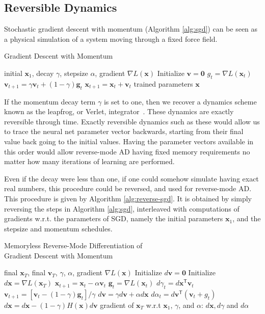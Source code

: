 \documentclass{article}
\newcommand{\vx}{\mathbf{x}}
\newcommand{\vv}{\mathbf{v}}
\newcommand{\vg}{\mathbf{g}}
\newcommand{\vzero}{\mathbf{0}}
\newcommand{\tra}{^{\mathsf{T}}}
\newcommand{\decay}{\gamma}
\newcommand{\stepsize}{\alpha}
\begin{document}
\subsection{Reversible Dynamics}

Stochastic gradient descent with momentum (Algorithm \ref{alg:sgd}) can be seen as a physical simulation of a system moving through a fixed force field.
%
\begin{algorithm}
   \caption{Gradient Descent with Momentum}
   \label{alg:sgd}
\begin{algorithmic}
    initial $\vx_1$, decay $\decay$, stepsize $\stepsize$, gradient $\nabla L(\vx)$
   \STATE Initialize $\vv = \vzero$
   \STATE $g_t = \nabla L(\vx_t)$
   \STATE $\vv_{t+1} = \decay \vv_t + (1 - \decay) \vg_t$ 
   \STATE $\vx_{t+1} = \vx_t + \vv_t$ 
   \ENDFOR
   \RETURN trained parameters $\vx$   
\end{algorithmic}
\end{algorithm}
%
If the momentum decay term $\gamma$ is set to one, then we recover a dynamics scheme known as the leapfrog, or Verlet, integrator~\citep{leapfrog1995}.
These dynamics are exactly reversible through time.
Exactly reversible dynamics such as these would allow us to trace the neural net parameter vector backwards, starting from their final value back going to the initial values.
Having the parameter vectors available in this order would allow reverse-mode AD having fixed memory requirements no matter how many iterations of learning are performed.

Even if the decay were less than one, if one could somehow simulate having exact real numbers, this procedure could be reversed, and used for reverse-mode AD.
This procedure is given by Algorithm \ref{alg:reverse-sgd}.
It is obtained by simply reversing the steps in Algorithm \ref{alg:sgd}, interleaved with computations of gradients w.r.t. the parameters of SGD, namely the initial parameters $\vx_1$, and the stepsize and momentum schedules.
%
\begin{algorithm}
   \caption{Memoryless Reverse-Mode Differentiation of \\Gradient Descent with Momentum}
   \label{alg:reverse-sgd}
\begin{algorithmic}
    final $\vx_T$, final $\vv_T$, $\decay$, $\stepsize$, gradient $\nabla L(\vx)$
   \STATE Initialize $d\vv = \vzero$
   \STATE Initialize $d\vx = \nabla L(\vx_T)$
    \STATE $\vx_{t+1} = \vx_t - \stepsize \vv_t$  
   \STATE $\vg_t = \nabla L(\vx_t)$
   \STATE $d\decay_t = d\vx\tra \vv_t$
   \STATE $\vv_{t+1} = [\vv_t - (1 - \decay) \vg_t] / \decay$ 
   \STATE $d\vv = \decay d\vv + \stepsize d\vx$
   \STATE $d\stepsize_t = d\vv\tra(\vv_t + g_t)$
   \STATE $d\vx = d\vx - (1 - \decay) H(\vx) d\vv$
   \ENDFOR
   \RETURN gradient of $\vx_T$ w.r.t $\vx_1$, $\decay$, and $\stepsize$: $d\vx, d\decay$ and $d\stepsize$
\end{algorithmic}
\end{algorithm}
%
\end{document}
